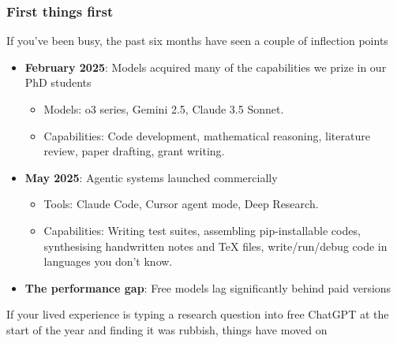 \documentclass[aspectratio=169]{beamer}
\begin{document}
\begin{frame}
    \frametitle{First things first}
    If you've been busy, the past six months have seen a couple of inflection points
    \vspace{0.5cm}
    \begin{itemize}
        \item \textbf{February 2025}: Models acquired many of the capabilities we prize in our PhD students
            \begin{itemize}
                \item Models: o3 series, Gemini 2.5, Claude 3.5 Sonnet.
                \item Capabilities: Code development, mathematical reasoning, literature review, paper drafting, grant writing.
            \end{itemize}
        \item \textbf{May 2025}: Agentic systems launched commercially
            \begin{itemize}
                \item Tools: Claude Code, Cursor agent mode, Deep Research.
                \item Capabilities: Writing test suites, assembling pip-installable codes, synthesising handwritten notes and TeX files, write/run/debug code in languages you don't know.
            \end{itemize}
        \item \textbf{The performance gap}: Free models lag significantly behind paid versions
    \end{itemize}
    
    \vspace{0.5cm}
    If your lived experience is typing a research question into free ChatGPT at the start of the year and finding it was rubbish, things have moved on
\end{frame}
\end{document}
